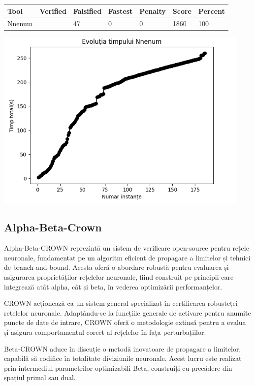 \documentclass[12pt,a4paper]{article}
\begin{document}
\begin{tabularx}{1.1\textwidth}{ | >{\centering\arraybackslash}X | >{\centering\arraybackslash}X | X | X | X | X | X | }
  \hline
   Tool & Verified & Falsified & Fastest & Penalty & Score & Percent \\
\hline
   Nnenum & 139 & 47 & 0 & 0 & 1860 & 100 \\
\hline
\end{tabularx}
\includegraphics[]{timp_nn.png}


\vspace{5mm}
\subsection{Alpha-Beta-Crown}
Alpha-Beta-CROWN reprezintă un sistem de verificare open-source pentru rețele neuronale, fundamentat pe un algoritm eficient de propagare a limitelor și tehnici de branch-and-bound. Acesta oferă o abordare robustă pentru evaluarea și asigurarea proprietăților rețelelor neuronale, fiind construit pe principii care integrează atât alpha, cât și beta, în vederea optimizării performanțelor. \cite{Alpha-Beta-CROWN}

CROWN acționează ca un sistem general specializat în certificarea robusteței rețelelor neuronale. Adaptându-se la funcțiile generale de activare pentru anumite puncte de date de intrare, CROWN oferă o metodologie extinsă pentru a evalua și asigura comportamentul corect al rețelelor în fața perturbațiilor.

Beta-CROWN aduce în discuție o metodă inovatoare de propagare a limitelor, capabilă să codifice în totalitate diviziunile neuronale. Acest lucru este realizat prin intermediul parametrilor optimizabili Beta, construiți cu precădere din spațiul primal sau dual.
\end{document}
